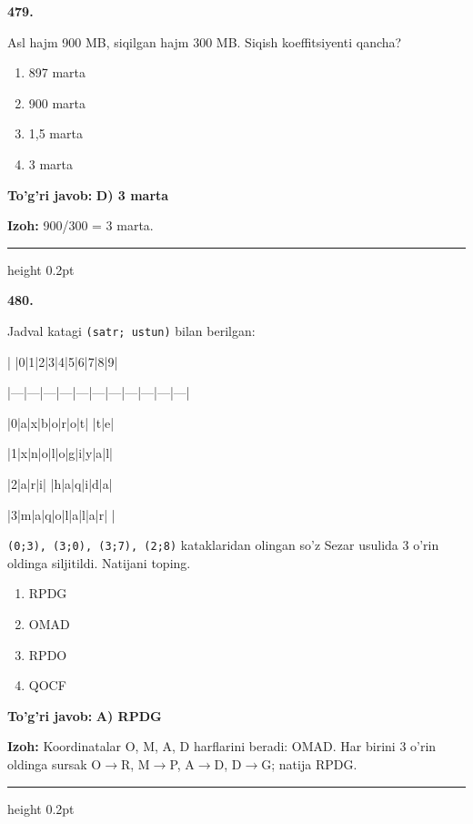 \documentclass[10pt,a4paper,oneside]{article}
\begin{document}
\noindent\textbf{\color{ink}479.}
\par
Asl hajm 900 MB, siqilgan hajm 300 MB. Siqish koeffitsiyenti qancha?
\begin{enumerate}[label=\Alph*),leftmargin=9mm]
\item 897 marta
\item 900 marta
\item 1,5 marta
\item 3 marta
\end{enumerate}
\begin{tcolorbox}[enhanced,breakable,colback=teal!4,colframe=teal!50!black,boxrule=0.5pt,arc=1.1mm,left=3mm,right=3mm,top=1.7mm,bottom=1.7mm,before skip=2mm,after skip=2mm]
\textbf{\color{teal}To'g'ri javob:} \textbf{D) 3 marta}
\par\smallskip
\textbf{Izoh:} 900/300 = 3 marta.
\end{tcolorbox}
\vspace{2mm}\hrule height 0.2pt \vspace{3mm}

\noindent\textbf{\color{ink}480.}
\par
Jadval katagi \texttt{(satr; ustun)} bilan berilgan:
\medskip\par
| |0|1|2|3|4|5|6|7|8|9|
\par
|---|---|---|---|---|---|---|---|---|---|---|
\par
|0|a|x|b|o|r|o|t| |t|e|
\par
|1|x|n|o|l|o|g|i|y|a|l|
\par
|2|a|r|i| |h|a|q|i|d|a|
\par
|3|m|a|q|o|l|a|l|a|r| |
\medskip\par
\texttt{(0;3), (3;0), (3;7), (2;8)} kataklaridan olingan so'z Sezar usulida 3 o'rin oldinga siljitildi. Natijani toping.
\begin{enumerate}[label=\Alph*),leftmargin=9mm]
\item RPDG
\item OMAD
\item RPDO
\item QOCF
\end{enumerate}
\begin{tcolorbox}[enhanced,breakable,colback=teal!4,colframe=teal!50!black,boxrule=0.5pt,arc=1.1mm,left=3mm,right=3mm,top=1.7mm,bottom=1.7mm,before skip=2mm,after skip=2mm]
\textbf{\color{teal}To'g'ri javob:} \textbf{A) RPDG}
\par\smallskip
\textbf{Izoh:} Koordinatalar O, M, A, D harflarini beradi: OMAD. Har birini 3 o'rin oldinga sursak O\ensuremath{\to}R, M\ensuremath{\to}P, A\ensuremath{\to}D, D\ensuremath{\to}G; natija RPDG.
\end{tcolorbox}
\vspace{2mm}\hrule height 0.2pt \vspace{3mm}
\end{document}
